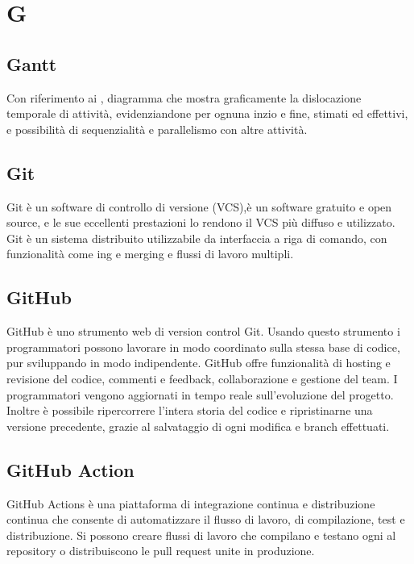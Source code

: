 \chapter{G}

\section{Gantt}
Con riferimento ai , diagramma che mostra graficamente la dislocazione temporale di attività, evidenziandone per ognuna inzio e fine, stimati ed effettivi, e possibilità di sequenzialità e parallelismo con altre attività.

\section{Git}
Git è un software di controllo di versione (VCS),è un software gratuito e open source, e le sue eccellenti prestazioni lo rendono il VCS più diffuso e utilizzato.
Git è un sistema distribuito utilizzabile da interfaccia a riga di comando, con funzionalità come ing e merging e flussi di lavoro multipli.

\section{GitHub}
GitHub è uno strumento web di version control Git. Usando questo strumento i programmatori possono lavorare in modo coordinato sulla stessa base di codice, pur sviluppando in modo indipendente.
GitHub offre funzionalità di hosting e revisione del codice, commenti e feedback, collaborazione e gestione del team. I programmatori vengono aggiornati in tempo reale sull'evoluzione del progetto. Inoltre è possibile ripercorrere l'intera storia del codice e ripristinarne una versione precedente, grazie al salvataggio di ogni modifica e branch effettuati.

\section{GitHub Action}\label{sec:GitHub Actions}
GitHub Actions è una piattaforma di integrazione continua e distribuzione continua che consente di automatizzare il flusso di lavoro, di compilazione, test e distribuzione. Si possono creare flussi di lavoro che compilano e testano ogni  al repository o distribuiscono le pull request unite in produzione.

